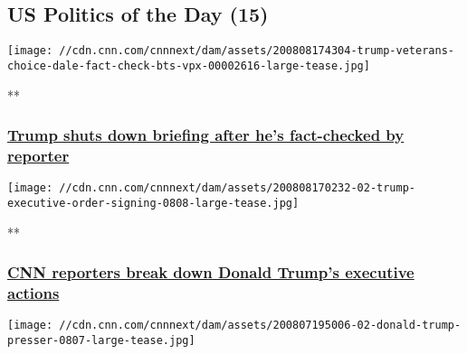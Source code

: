 \hypertarget{us-politics-of-the-day-15}{%
\subsection{US Politics of the Day
(15)}\label{us-politics-of-the-day-15}}

\href{/videos/politics/2020/08/08/trump-veterans-choice-dale-fact-check-bts-vpx.cnn/video/playlists/this-week-in-politics/}{}

\texttt{[image: //cdn.cnn.com/cnnnext/dam/assets/200808174304-trump-veterans-choice-dale-fact-check-bts-vpx-00002616-large-tease.jpg]}

**

\hypertarget{trump-shuts-down-briefing-after-hes-fact-checked-by-reporter}{%
\subsubsection{\texorpdfstring{\href{/videos/politics/2020/08/08/trump-veterans-choice-dale-fact-check-bts-vpx.cnn/video/playlists/this-week-in-politics/}{Trump
shuts down briefing after he's fact-checked by
reporter}}{Trump shuts down briefing after he's fact-checked by reporter}}\label{trump-shuts-down-briefing-after-hes-fact-checked-by-reporter}}

\href{/videos/politics/2020/08/08/trump-signs-executive-actions-unemployment-stimulus-holmes-dale-nr-vpx.cnn/video/playlists/this-week-in-politics/}{}

\texttt{[image: //cdn.cnn.com/cnnnext/dam/assets/200808170232-02-trump-executive-order-signing-0808-large-tease.jpg]}

**

\hypertarget{cnn-reporters-break-down-donald-trumps-executive-actions}{%
\subsubsection{\texorpdfstring{\href{/videos/politics/2020/08/08/trump-signs-executive-actions-unemployment-stimulus-holmes-dale-nr-vpx.cnn/video/playlists/this-week-in-politics/}{CNN
reporters break down Donald Trump's executive
actions}}{CNN reporters break down Donald Trump's executive actions}}\label{cnn-reporters-break-down-donald-trumps-executive-actions}}

\href{/videos/politics/2020/08/08/trump-comments-bedminster-before-press-conference-sot-ctn-vpx.cnn/video/playlists/this-week-in-politics/}{}

\texttt{[image: //cdn.cnn.com/cnnnext/dam/assets/200807195006-02-donald-trump-presser-0807-large-tease.jpg]}


